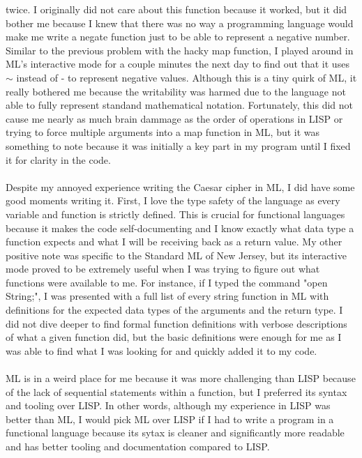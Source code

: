 \documentclass[letterpaper, 10pt, DIV=13]{scrartcl}
\numberwithin{equation}{section}
\numberwithin{figure}{section}
\numberwithin{table}{section}
\begin{document}
twice. I originally did not care about this function because it worked, but it did bother me because I knew that there was no way a programming language would
make me write a negate function just to be able to represent a negative number. Similar to the previous problem with the hacky map function, I played around in 
ML's interactive mode for a couple minutes the next day to find out that it uses $\sim$ instead of - to represent negative values. Although this is a tiny quirk of ML, 
it really bothered me because the writability was harmed due to the language not able to fully represent standand mathematical notation. Fortunately, this did not 
cause me nearly as much brain dammage as the order of operations in LISP or trying to force multiple arguments into a map function in ML, but it was something to note
because it was initially a key part in my program until I fixed it for clarity in the code.
\\ \\
Despite my annoyed experience writing the Caesar cipher in ML, I did have some good moments writing it. First, I love the type safety of the language as every
variable and function is strictly defined. This is crucial for functional languages because it makes the code self-documenting and I know exactly what data type
a function expects and what I will be receiving back as a return value. My other positive note was specific to the Standard ML of New Jersey, but its interactive
mode proved to be extremely useful when I was trying to figure out what functions were available to me. For instance, if I typed the command "open String;", I was 
presented with a full list of every string function in ML with definitions for the expected data types of the arguments and the return type. I did not dive deeper to
find formal function definitions with verbose descriptions of what a given function did, but the basic definitions were enough for me as I was able to find
what I was looking for and quickly added it to my code.
\\ \\
ML is in a weird place for me because it was more challenging than LISP because of the lack of sequential statements within a function, but I preferred its syntax and
tooling over LISP. In other words, although my experience in LISP was better than ML, I would pick ML over LISP if I had to write a program in a functional language
because its sytax is cleaner and significantly more readable and has better tooling and documentation compared to LISP.
\end{document}
